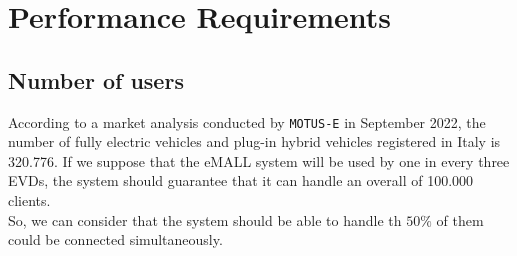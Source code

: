 \section{Performance Requirements}
\label{sec:performance_requirements}%
\subsection*{Number of users}
According to a market analysis conducted by \verb|MOTUS-E| in September 2022,
the number of fully electric vehicles and plug-in hybrid vehicles registered in Italy is 320.776.
If we suppose that the eMALL system will be used by one in every three EVDs,
the system should guarantee that it can handle an overall of 100.000 clients. \\
So, we can consider that the system should be able to handle th $50\%$ of them could be connected simultaneously.

